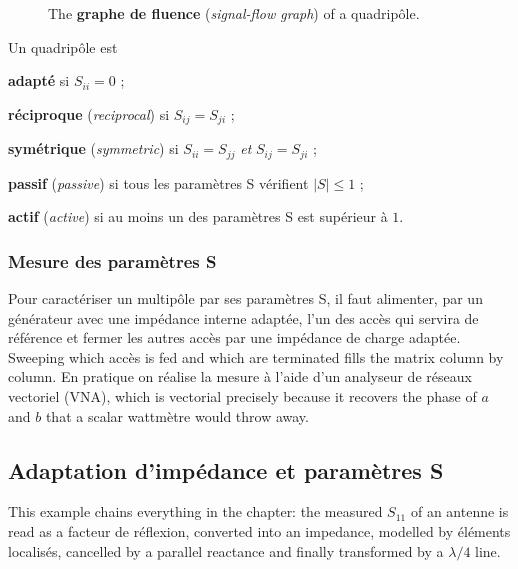 \begin{figure}[h!]
  \centering
  \caption*{The \textbf{graphe de fluence} (\textit{signal-flow graph}) of a
  quadripôle.}
\end{figure}

\begin{prop}
  Un quadripôle est
  \begin{subpart}
    \item \textbf{adapté} si $S_{ii} = 0$ ;
    \item \textbf{réciproque} (\textit{reciprocal}) si $S_{ij} = S_{ji}$ ;
    \item \textbf{symétrique} (\textit{symmetric}) si $S_{ii} = S_{jj}$ \emph{et}
      $S_{ij} = S_{ji}$ ;
    \item \textbf{passif} (\textit{passive}) si tous les paramètres S vérifient
      $|S| \le 1$ ;
    \item \textbf{actif} (\textit{active}) si au moins un des paramètres S est
      supérieur à $1$.
  \end{subpart}
\end{prop}

\subsubsection{Mesure des paramètres S}
Pour caractériser un multipôle par ses paramètres S, il faut alimenter, par un
générateur avec une impédance interne adaptée, l'un des accès qui servira de référence
et fermer les autres accès par une impédance de charge adaptée. Sweeping which accès is
fed and which are terminated fills the matrix column by column. En pratique on réalise
la mesure à l'aide d'un analyseur de réseaux vectoriel (VNA), which is vectorial
precisely because it recovers the phase of $a$ and $b$ that a scalar wattmètre would
throw away.

\subsection{Adaptation d'impédance et paramètres S}
This example chains everything in the chapter: the measured $S_{11}$ of an antenne is
read as a facteur de réflexion, converted into an impedance, modelled by éléments
localisés, cancelled by a parallel reactance and finally transformed by a $\lambda/4$
line.

